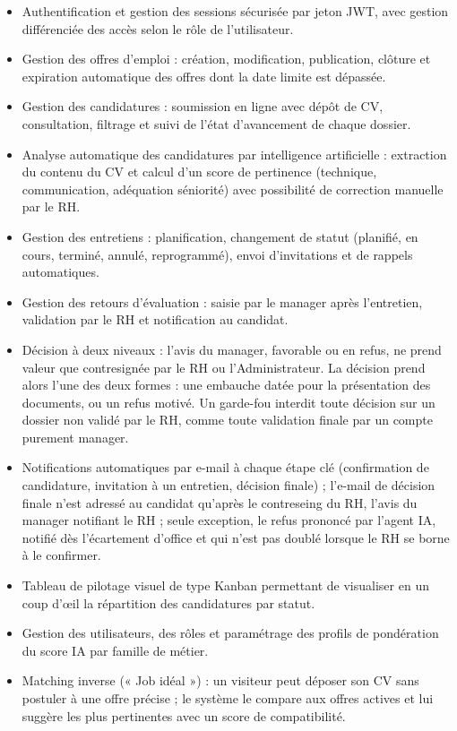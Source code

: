 \documentclass[]{./tpl/isipfe}
\begin{document}
\begin{itemize}
\item Authentification et gestion des sessions sécurisée par jeton JWT, avec gestion différenciée des accès selon le rôle de l’utilisateur.
\item Gestion des offres d’emploi : création, modification, publication, clôture et expiration automatique des offres dont la date limite est dépassée.
\item Gestion des candidatures : soumission en ligne avec dépôt de CV, consultation, filtrage et suivi de l’état d’avancement de chaque dossier.
\item Analyse automatique des candidatures par intelligence artificielle : extraction du contenu du CV et calcul d’un score de pertinence (technique, communication, adéquation séniorité) avec possibilité de correction manuelle par le RH.
\item Gestion des entretiens : planification, changement de statut (planifié, en cours, terminé, annulé, reprogrammé), envoi d’invitations et de rappels automatiques.
\item Gestion des retours d’évaluation : saisie par le manager après l’entretien, validation par le RH et notification au candidat.
\item Décision à deux niveaux : l’avis du manager, favorable ou en refus, ne prend valeur que contresignée par le RH ou l’Administrateur. La décision prend alors l’une des deux formes : une embauche datée pour la présentation des documents, ou un refus motivé. Un garde-fou interdit toute décision sur un dossier non validé par le RH, comme toute validation finale par un compte purement manager.
\item Notifications automatiques par e-mail à chaque étape clé (confirmation de candidature, invitation à un entretien, décision finale) ; l’e-mail de décision finale n’est adressé au candidat qu’après le contreseing du RH, l’avis du manager notifiant le RH ; seule exception, le refus prononcé par l’agent IA, notifié dès l’écartement d’office et qui n’est pas doublé lorsque le RH se borne à le confirmer.
\item Tableau de pilotage visuel de type Kanban permettant de visualiser en un coup d’œil la répartition des candidatures par statut.
\item Gestion des utilisateurs, des rôles et paramétrage des profils de pondération du score IA par famille de métier.
\item Matching inverse (« Job idéal ») : un visiteur peut déposer son CV sans postuler à une offre précise ; le système le compare aux offres actives et lui suggère les plus pertinentes avec un score de compatibilité.
\end{itemize}
\end{document}
